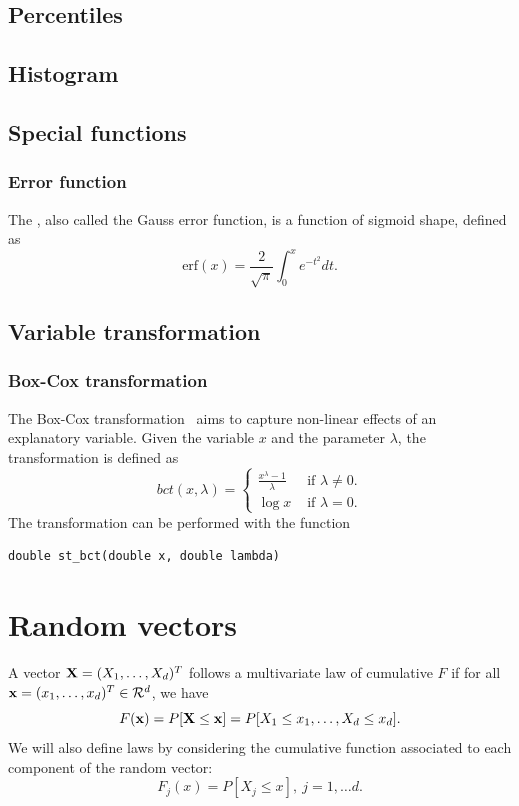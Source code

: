 \subsection{Percentiles}

\subsection{Histogram}

\subsection{Special functions}

\subsubsection{Error function}

The , also called the Gauss error function, is a function of sigmoid shape, defined as
\[
\mbox{erf}(x) = \frac{2}{\sqrt{\pi}} \int_0^x e^{-t^2} dt.
\]

\subsection{Variable transformation}

\subsubsection{Box-Cox transformation}

The Box-Cox transformation~\cite{BoxCox64} aims to capture non-linear effects of an explanatory variable.
Given the variable $x$ and the parameter $\lambda$, the transformation is defined as
\[
bct(x,\lambda) =
\begin{cases}
\frac{x^{\lambda}-1}{\lambda} & \mbox{ if } \lambda \ne 0.\\
\log x & \mbox{ if } \lambda = 0.
\end{cases}
\]
The transformation can be performed with the function
\begin{verbatim}
double st_bct(double x, double lambda)
\end{verbatim}

\section{Random vectors}

A vector ${\bf X} = (X_1,\dots,X_d)^T$ follows a multivariate law of
cumulative  $F$ if for all
${\bf x} = (x_1,\dots,x_d)^T \in \mathcal{R}^d$, we have
\[
  {F}({\bf x}) = P[{\bf X}\le {\bf x}] = P[X_1\le x_1,\dots, X_d\le x_d].
\]
We will also define  laws by considering the
cumulative function associated to each component of the random vector:
\[
{F_j}(x) = P[X_j\le x],\ j = 1,\ldots d.
\]

